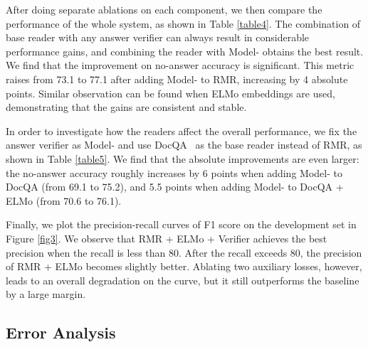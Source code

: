 \documentclass[letterpaper]{article} \usepackage{aaai19}  \usepackage{times}  \usepackage{helvet}  \usepackage{courier}  \usepackage{url}  \usepackage{graphicx}  \usepackage{pbox}
\begin{document}
After doing separate ablations on each component, we then compare the performance of the whole system, as shown in Table \ref{table4}.
The combination of base reader with any answer verifier can always result in considerable performance gains, and combining the reader with Model-\uppercase\expandafter{} obtains the best result.
We find that the improvement on no-answer accuracy is significant. 
This metric raises from 73.1 to 77.1 after adding Model-\uppercase\expandafter{} to RMR, increasing by 4 absolute points.
Similar observation can be found when ELMo embeddings are used, demonstrating that the gains are consistent and stable.

In order to investigate how the readers affect the overall performance, we fix the answer verifier as Model-\uppercase\expandafter{} and use DocQA~\cite{Clark18} as the base reader instead of RMR, as shown in Table \ref{table5}. 
We find that the absolute improvements are even larger: the no-answer accuracy roughly increases by 6 points when adding Model-\uppercase\expandafter{} to DocQA (from 69.1 to 75.2), and 5.5 points when adding Model-\uppercase\expandafter{} to DocQA + ELMo (from 70.6 to 76.1).

Finally, we plot the precision-recall curves of F1 score on the development set in Figure \ref{fig3}.
We observe that RMR + ELMo + Verifier achieves the best precision when the recall is less than 80.
After the recall exceeds 80, the precision of RMR + ELMo becomes slightly better.
Ablating two auxiliary losses, however, leads to an overall degradation on the curve, but it still outperforms the baseline by a large margin.


\subsection{Error Analysis}
\end{document}
